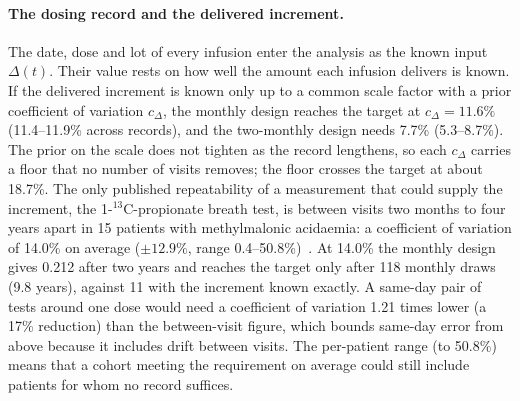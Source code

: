 \paragraph{The dosing record and the delivered increment.} The date, dose and lot of every
infusion enter the analysis as the known input $\Delta(t)$. Their value rests on how well the
amount each infusion delivers is known. If the delivered increment is known only up to a common
scale factor with a prior coefficient of variation $c_\Delta$, the monthly design reaches the
target at $c_\Delta=11.6\%$ (11.4--11.9\% across records), and the two-monthly design needs
7.7\% (5.3--8.7\%). The prior on the scale does not tighten as the record lengthens, so each
$c_\Delta$ carries a floor that no number of visits removes; the floor crosses the target at
about 18.7\%. The only published repeatability of a measurement that could supply the increment,
the 1-$^{13}$C-propionate breath test, is between visits two months to four years apart in 15
patients with methylmalonic acidaemia: a coefficient of variation of 14.0\% on average
($\pm12.9\%$, range 0.4--50.8\%)~\cite{breath_test_mma}. At 14.0\% the monthly design gives 0.212
after two years and reaches the target only after 118 monthly draws (9.8 years), against 11 with
the increment known exactly. A same-day pair of tests around one dose would need a coefficient of
variation 1.21 times lower (a 17\% reduction) than the between-visit figure, which bounds same-day error from
above because it includes drift between visits. The per-patient range (to 50.8\%) means that a
cohort meeting the requirement on average could still include patients for whom no record
suffices.

